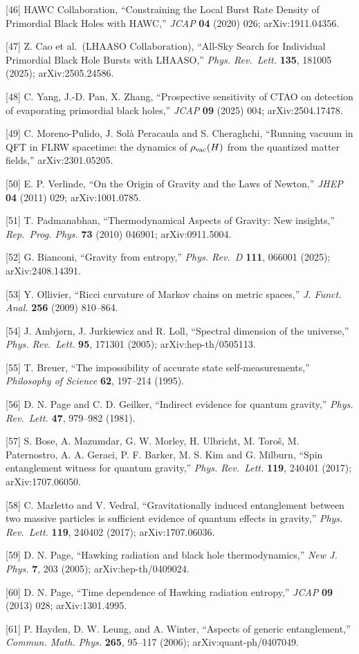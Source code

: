 \documentclass[
]{article}
\begin{document}
{[}46{]} HAWC Collaboration, ``Constraining the Local Burst Rate Density
of Primordial Black Holes with HAWC,'' \emph{JCAP} \textbf{04} (2020)
026; arXiv:1911.04356.

{[}47{]} Z. Cao et al.~(LHAASO Collaboration), ``All-Sky Search for
Individual Primordial Black Hole Bursts with LHAASO,'' \emph{Phys.
Rev.~Lett.} \textbf{135}, 181005 (2025); arXiv:2505.24586.

{[}48{]} C. Yang, J.-D. Pan, X. Zhang, ``Prospective sensitivity of CTAO
on detection of evaporating primordial black holes,'' \emph{JCAP}
\textbf{09} (2025) 004; arXiv:2504.17478.

{[}49{]} C. Moreno-Pulido, J. Solà Peracaula and S. Cheraghchi,
``Running vacuum in QFT in FLRW spacetime: the dynamics of
\(\rho_{\rm vac}(H)\) from the quantized matter fields,''
arXiv:2301.05205.

{[}50{]} E. P. Verlinde, ``On the Origin of Gravity and the Laws of
Newton,'' \emph{JHEP} \textbf{04} (2011) 029; arXiv:1001.0785.

{[}51{]} T. Padmanabhan, ``Thermodynamical Aspects of Gravity: New
insights,'' \emph{Rep.~Prog. Phys.} \textbf{73} (2010) 046901;
arXiv:0911.5004.

{[}52{]} G. Bianconi, ``Gravity from entropy,'' \emph{Phys. Rev.~D}
\textbf{111}, 066001 (2025); arXiv:2408.14391.

{[}53{]} Y. Ollivier, ``Ricci curvature of Markov chains on metric
spaces,'' \emph{J. Funct. Anal.} \textbf{256} (2009) 810--864.

{[}54{]} J. Ambjørn, J. Jurkiewicz and R. Loll, ``Spectral dimension of
the universe,'' \emph{Phys. Rev.~Lett.} \textbf{95}, 171301 (2005);
arXiv:hep-th/0505113.

{[}55{]} T. Breuer, ``The impossibility of accurate state
self-measurements,'' \emph{Philosophy of Science} \textbf{62}, 197--214
(1995).

{[}56{]} D. N. Page and C. D. Geilker, ``Indirect evidence for quantum
gravity,'' \emph{Phys. Rev.~Lett.} \textbf{47}, 979--982 (1981).

{[}57{]} S. Bose, A. Mazumdar, G. W. Morley, H. Ulbricht, M. Toroš, M.
Paternostro, A. A. Geraci, P. F. Barker, M. S. Kim and G. Milburn,
``Spin entanglement witness for quantum gravity,'' \emph{Phys.
Rev.~Lett.} \textbf{119}, 240401 (2017); arXiv:1707.06050.

{[}58{]} C. Marletto and V. Vedral, ``Gravitationally induced
entanglement between two massive particles is sufficient evidence of
quantum effects in gravity,'' \emph{Phys. Rev.~Lett.} \textbf{119},
240402 (2017); arXiv:1707.06036.

{[}59{]} D. N. Page, ``Hawking radiation and black hole
thermodynamics,'' \emph{New J. Phys.} \textbf{7}, 203 (2005);
arXiv:hep-th/0409024.

{[}60{]} D. N. Page, ``Time dependence of Hawking radiation entropy,''
\emph{JCAP} \textbf{09} (2013) 028; arXiv:1301.4995.

{[}61{]} P. Hayden, D. W. Leung, and A. Winter, ``Aspects of generic
entanglement,'' \emph{Commun. Math. Phys.} \textbf{265}, 95--117 (2006);
arXiv:quant-ph/0407049.
\end{document}
